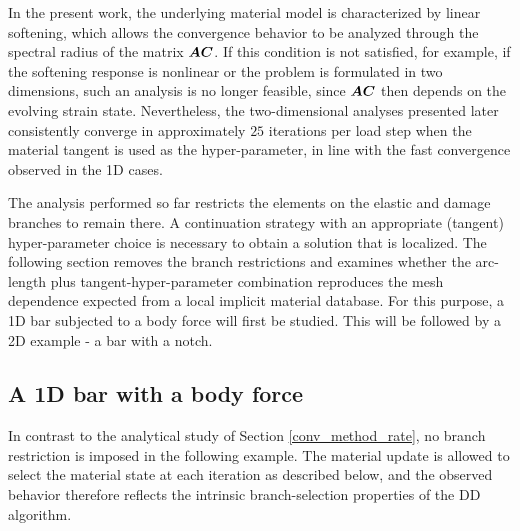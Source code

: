 \documentclass[10pt]{cas-sc}
\newenvironment{addedblock}
{\begingroup\color{blue!80}}
{\endgroup}
\begin{document}



In the present work, the underlying material model is characterized by linear softening, which allows the convergence behavior to be analyzed through the spectral radius of the matrix 
$ \mbox{\boldmath $A$} \mbox{\boldmath $C$}$. If this condition is not satisfied, for example, if the softening response is nonlinear or the problem is formulated in two dimensions, such an analysis is no longer feasible, since $ \mbox{\boldmath $A$} \mbox{\boldmath $C$}$ then depends on the evolving strain state. Nevertheless, the two-dimensional analyses presented later consistently converge in approximately $25$ iterations per load step when the material tangent is used as the hyper-parameter, in line with the fast convergence observed in the 1D cases.

\begin{addedblock}
The analysis performed so far restricts the elements on the elastic and damage branches to remain there. A continuation strategy with an appropriate (tangent) hyper-parameter choice is necessary to obtain a solution that is localized. The following section removes the branch restrictions and examines whether the arc-length plus tangent-hyper-parameter combination reproduces the mesh dependence expected from a local implicit material database. For this purpose, a 1D bar subjected to a body force will first be studied. This will be followed by a 2D example - a bar with a notch. 
\end{addedblock}


\subsection{A 1D bar with a body force\label{1d_bar_with_bf}}
In contrast to the analytical study of Section \ref{conv_method_rate}, no branch restriction is imposed in the following example. The material update is allowed to select the material state at each iteration as described below, and the observed behavior therefore reflects the intrinsic branch-selection properties of the DD algorithm. 
\end{document}
